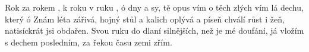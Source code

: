 \begin{TEXT}{Rok za rokem}
\REFREN  {}    , k roku  \NL
v ruku , ó      \NL
{} dny a   
\SLOKA {} sy,  tě  opus \NL
vím o těch  zlých \NL
vím  lá \NL
{}dechu, který  ó
\SLOKA Znám léta zářivá,\NL
hojný stůl a kalich oplývá\NL
a píseň chválí růst i žeň,\NL
natisíckrát jsi obdařen. 
\SLOKA Svou ruku do dlaní\NL
silnějších, než je mé doufání,\NL
já vložím s dechem posledním,\NL
za řekou času zemi zřím. \NL
\end{TEXT}
